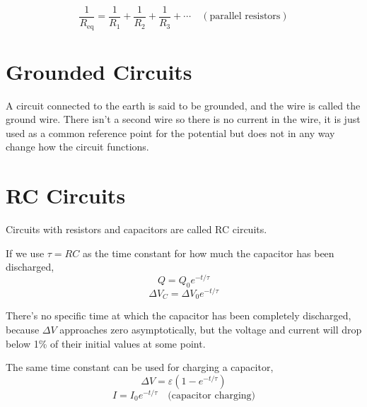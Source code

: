 \documentclass{article}
\begin{document}
\[\frac{1}{R_\text{eq}}=\frac{1}{R_1} + \frac{1}{R_2} + \frac{1}{R_3} + \cdots\quad
(\text{parallel resistors})\]

\section*{Grounded Circuits}
A circuit connected to the earth is said to be grounded, and the wire is called the ground wire.
There isn't a second wire so there is no current in the wire, it is just used as a common reference
point for the potential but does not in any way change how the circuit functions.

\section*{RC Circuits}
Circuits with resistors and capacitors are called RC circuits.

If we use $\tau=RC$ as the time constant for how much the capacitor has been discharged,
\[Q=Q_0 e^{-t/\tau}\]
\[\Delta V_C=\Delta V_0 e^{-t/\tau}\]

There's no specific time at which the capacitor has been completely discharged, because $\Delta V$
approaches zero asymptotically, but the voltage and current will drop below 1\% of their initial
values at some point.

\vspace{1em}

The same time constant can be used for charging a capacitor,
\[\Delta V=\varepsilon(1-e^{-t/\tau})\]
\[I=I_0 e^{-t/\tau}\quad\text{(capacitor charging)}\]
\end{document}
